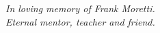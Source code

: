 %

\vspace*{\fill}
\begin{center}
      \emph{In loving memory of Frank Moretti.\\
      		Eternal mentor, teacher and friend.}
\end{center}
\vspace*{\fill}

